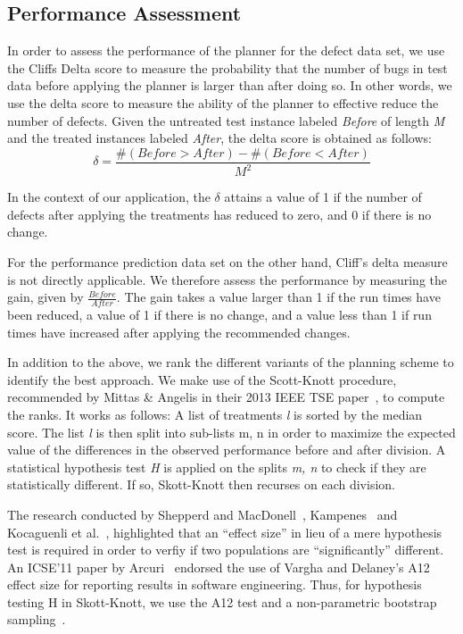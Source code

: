 \documentclass[conference]{IEEEtran}
\begin{document}
\subsection{Performance Assessment}

In order to assess the performance of the planner for the defect data set, we use the Cliffs Delta score to measure the probability that the number of bugs in test data before applying the planner is larger than after doing so. In other words, we use the delta score to measure the ability of the planner to effective reduce the number of defects. Given the untreated test instance labeled \textit{Before} of length \textit{M} and the treated instances labeled \textit{After}, the delta score is obtained as follows:
\begin{equation}
\delta = \frac{\#(Before>After) - \#(Before<After)}{M^2}
\end{equation}

In the context of our application, the $\delta$ attains a value of 1 if the number of defects after applying the treatments has reduced to zero, and 0 if there is no change.

For the performance prediction data set on the other hand, Cliff's delta measure is not directly applicable. We therefore assess the performance by measuring the gain, given by $\frac{Before}{After}$. The gain takes a value larger than 1 if the run times have been reduced, a value of 1 if there is no change, and a value less than 1 if run times have increased after applying the recommended changes. 

In addition to the above, we rank the different variants of the planning scheme to identify the best approach. We make use of the Scott-Knott procedure, recommended by Mittas \& Angelis in their 2013 IEEE TSE paper~\cite{sk}, to compute the ranks. It works as follows: A list of treatments \textit{l} is sorted by the median score. The list \textit{l} is then split into sub-lists m, n in order to maximize the expected value of the differences in the observed performance before and after division. A statistical hypothesis test \textit{H} is applied on the splits \textit{m, n} to check if they are statistically different. If so, Skott-Knott then recurses on each division. 

The research conducted by Shepperd and MacDonell~\cite{}, Kampenes~\cite{} and Kocaguenli et al.~\cite{}, highlighted that an ``effect size'' in lieu of a mere hypothesis test is required in order to verfiy if two populations are ``significantly'' different. An ICSE'11 paper by Arcuri~\cite{} endorsed the use of Vargha and Delaney's A12 effect size for reporting results in software engineering. Thus, for hypothesis testing H in Skott-Knott, we use the A12 test and a non-parametric bootstrap sampling~\cite{}.
\end{document}
